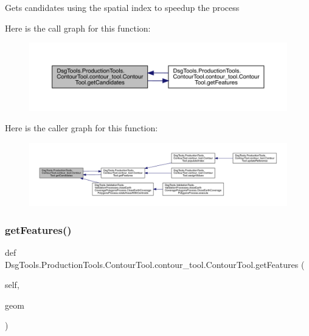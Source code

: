 \begin{DoxyVerb}Gets candidates using the spatial index to speedup the process
\end{DoxyVerb}
 Here is the call graph for this function\+:
\nopagebreak
\begin{figure}[H]
\begin{center}
\leavevmode
\includegraphics[width=350pt]{class_dsg_tools_1_1_production_tools_1_1_contour_tool_1_1contour__tool_1_1_contour_tool_a4bb8cc0232fcfdc145aed0aae3d07630_cgraph}
\end{center}
\end{figure}
Here is the caller graph for this function\+:
\nopagebreak
\begin{figure}[H]
\begin{center}
\leavevmode
\includegraphics[width=350pt]{class_dsg_tools_1_1_production_tools_1_1_contour_tool_1_1contour__tool_1_1_contour_tool_a4bb8cc0232fcfdc145aed0aae3d07630_icgraph}
\end{center}
\end{figure}
\mbox{\label{class_dsg_tools_1_1_production_tools_1_1_contour_tool_1_1contour__tool_1_1_contour_tool_ae3a9e1379fcfb2a84ffeba6d7c24853b}} 
\subsubsection{\texorpdfstring{get\+Features()}{getFeatures()}}
{\footnotesize\ttfamily def Dsg\+Tools.\+Production\+Tools.\+Contour\+Tool.\+contour\+\_\+tool.\+Contour\+Tool.\+get\+Features (\begin{DoxyParamCaption}\item[{}]{self,  }\item[{}]{geom }\end{DoxyParamCaption})}

